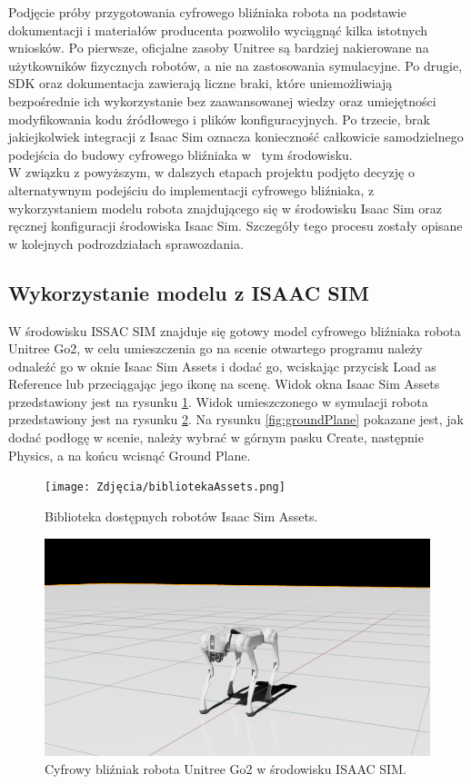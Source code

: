\documentclass[12pt]{article}
\begin{document}
\noindent Podjęcie próby przygotowania cyfrowego bliźniaka robota na podstawie dokumentacji i materiałów producenta pozwoliło wyciągnąć kilka istotnych wniosków. Po pierwsze, oficjalne zasoby Unitree są bardziej nakierowane na użytkowników fizycznych robotów, a nie na zastosowania symulacyjne. Po drugie, SDK oraz dokumentacja zawierają liczne braki, które uniemożliwiają bezpośrednie ich wykorzystanie bez zaawansowanej wiedzy oraz umiejętności modyfikowania kodu źródłowego i plików konfiguracyjnych. Po trzecie, brak jakiejkolwiek integracji z Isaac Sim oznacza konieczność całkowicie samodzielnego podejścia do budowy cyfrowego bliźniaka w~ tym środowisku.\\

\noindent W związku z powyższym, w dalszych etapach projektu podjęto decyzję o alternatywnym podejściu do implementacji cyfrowego bliźniaka, z wykorzystaniem modelu robota znajdującego się w środowisku Isaac Sim oraz ręcznej konfiguracji środowiska Isaac Sim. Szczegóły tego procesu zostały opisane w kolejnych podrozdziałach sprawozdania.\\

\subsection{Wykorzystanie modelu z ISAAC SIM}
W środowisku ISSAC SIM znajduje się gotowy model cyfrowego bliźniaka robota Unitree Go2, w celu umieszczenia go na scenie otwartego programu należy odnaleźć go w oknie Isaac Sim Assets i dodać go, wciskając przycisk Load as Reference lub przeciągając jego ikonę na scenę. Widok okna Isaac Sim Assets przedstawiony jest na rysunku \ref{fig:Assets}. Widok umieszczonego w symulacji robota przedstawiony jest na rysunku \ref{fig:cyfrowyBlizniak}. Na rysunku \ref{fig:groundPlane} pokazane jest, jak dodać podłogę w scenie, należy wybrać w górnym pasku Create, następnie Physics,  a na końcu wcisnąć Ground Plane.  

\begin{figure}[h]
    \centering
    \texttt{[image: Zdjęcia/bibliotekaAssets.png]}
    \caption{Biblioteka dostępnych robotów Isaac Sim Assets.}
    \label{fig:Assets}
\end{figure}



\begin{figure}[h]
    \centering
    \includegraphics[width=0.75\linewidth]{Zdjęcia/cyfrowyBlizniakUnitryGo2.png}
    \caption{Cyfrowy bliźniak robota Unitree Go2 w środowisku ISAAC SIM.}
    \label{fig:cyfrowyBlizniak}
\end{figure}
\end{document}
